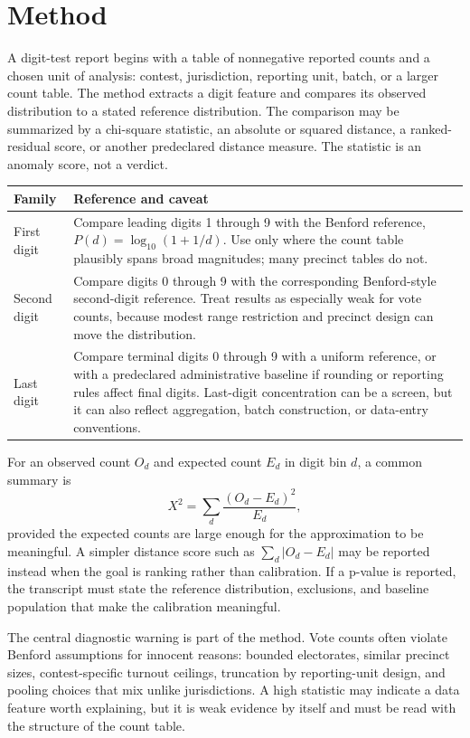 \section{Method}

A digit-test report begins with a table of nonnegative reported counts and a
chosen unit of analysis: contest, jurisdiction, reporting unit, batch, or a
larger count table. The method extracts a digit feature and compares its
observed distribution to a stated reference distribution. The comparison may be
summarized by a chi-square statistic, an absolute or squared distance, a
ranked-residual score, or another predeclared distance measure. The statistic is
an anomaly score, not a verdict.

\begin{center}
\small
\begin{tabularx}{\textwidth}{lX}
\toprule
Family & Reference and caveat \\
\midrule
First digit & Compare leading digits 1 through 9 with the Benford reference,
$P(d)=\log_{10}(1+1/d)$. Use only where the count table plausibly spans broad
magnitudes; many precinct tables do not. \\
Second digit & Compare digits 0 through 9 with the corresponding Benford-style
second-digit reference. Treat results as especially weak for vote counts,
because modest range restriction and precinct design can move the distribution. \\
Last digit & Compare terminal digits 0 through 9 with a uniform reference, or
with a predeclared administrative baseline if rounding or reporting rules affect
final digits. Last-digit concentration can be a screen, but it can also reflect
aggregation, batch construction, or data-entry conventions. \\
\bottomrule
\end{tabularx}
\end{center}

For an observed count $O_d$ and expected count $E_d$ in digit bin $d$, a common
summary is
\[
  X^2 = \sum_d \frac{(O_d-E_d)^2}{E_d},
\]
provided the expected counts are large enough for the approximation to be
meaningful. A simpler distance score such as $\sum_d |O_d-E_d|$ may be reported
instead when the goal is ranking rather than calibration. If a p-value is
reported, the transcript must state the reference distribution, exclusions, and
baseline population that make the calibration meaningful.

The central diagnostic warning is part of the method. Vote counts often violate
Benford assumptions for innocent reasons: bounded electorates, similar precinct
sizes, contest-specific turnout ceilings, truncation by reporting-unit design,
and pooling choices that mix unlike jurisdictions. A high statistic may indicate
a data feature worth explaining, but it is weak evidence by itself and must be
read with the structure of the count table.
